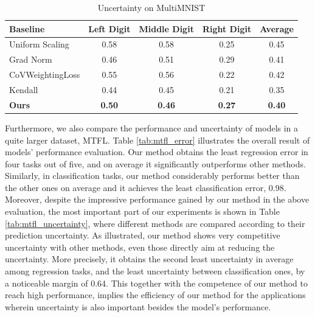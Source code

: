 \documentclass[12pt,a4paper]{article}
\begin{document}
	\begin{table}[htbp]
		\centering
		\caption{Uncertainty on MultiMNIST}
		\label{tab:multimnist_uncertainty}
		\begin{tabular}{lcccc}
			\toprule
			Baseline & Left Digit & Middle Digit & Right Digit & Average \\
			\midrule
			Uniform Scaling & 0.58 & 0.58 & 0.25 & 0.45 \\
			Grad Norm & 0.46 & 0.51 & 0.29 & 0.41 \\
			CoVWeightingLoss & 0.55 & 0.56 & 0.22 & 0.42 \\
			Kendall & 0.44 & 0.45 & 0.21 & 0.35 \\
			\textbf{Ours} & \textbf{0.50} & \textbf{0.46} & \textbf{0.27} & \textbf{0.40} \\
			\bottomrule
		\end{tabular}
	\end{table}
	
	Furthermore, we also compare the performance and uncertainty of models in a quite larger dataset, MTFL. Table \ref{tab:mtfl_error} illustrates the overall result of models' performance evaluation. Our method obtains the least regression error in four tasks out of five, and on average it significantly outperforms other methods. Similarly, in classification tasks, our method considerably performs better than the other ones on average and it achieves the least classification error, 0.98. Moreover, despite the impressive performance gained by our method in the above evaluation, the most important part of our experiments is shown in Table \ref{tab:mtfl_uncertainty}, where different methods are compared according to their prediction uncertainty. As illustrated, our method shows very competitive uncertainty with other methods, even those directly aim at reducing the uncertainty. More precisely, it obtains the second least uncertainty in average among regression tasks, and the least uncertainty between classification ones, by a noticeable margin of 0.64. This together with the competence of our method to reach high performance, implies the efficiency of our method for the applications wherein uncertainty is also important besides the model's performance.
	
\end{document}
